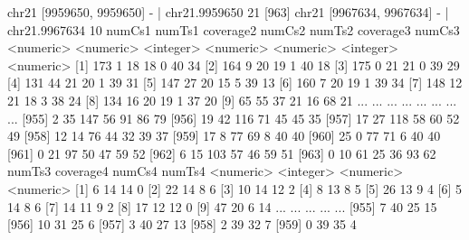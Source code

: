 \documentclass{article}
\begin{document}
\begin{Schunk}
\begin{Soutput}
  [962]    chr21   [9959650, 9959650]      -   |  chr21.9959650        21
  [963]    chr21   [9967634, 9967634]      -   |  chr21.9967634        10
           numCs1    numTs1 coverage2    numCs2    numTs2 coverage3    numCs3
        <numeric> <numeric> <integer> <numeric> <numeric> <integer> <numeric>
    [1]       173         1        18        18         0        40        34
    [2]       164         9        20        19         1        40        18
    [3]       175         0        21        21         0        39        29
    [4]       131        44        21        20         1        39        31
    [5]       147        27        20        15         5        39        13
    [6]       160         7        20        19         1        39        34
    [7]       148        12        21        18         3        38        24
    [8]       134        16        20        19         1        37        20
    [9]        65        55        37        21        16        68        21
    ...       ...       ...       ...       ...       ...       ...       ...
  [955]         2        35       147        56        91        86        79
  [956]        19        42       116        71        45        45        35
  [957]        17        27       118        58        60        52        49
  [958]        12        14        76        44        32        39        37
  [959]        17         8        77        69         8        40        40
  [960]        25         0        77        71         6        40        40
  [961]         0        21        97        50        47        59        52
  [962]         6        15       103        57        46        59        51
  [963]         0        10        61        25        36        93        62
           numTs3 coverage4    numCs4    numTs4
        <numeric> <integer> <numeric> <numeric>
    [1]         6        14        14         0
    [2]        22        14         8         6
    [3]        10        14        12         2
    [4]         8        13         8         5
    [5]        26        13         9         4
    [6]         5        14         8         6
    [7]        14        11         9         2
    [8]        17        12        12         0
    [9]        47        20         6        14
    ...       ...       ...       ...       ...
  [955]         7        40        25        15
  [956]        10        31        25         6
  [957]         3        40        27        13
  [958]         2        39        32         7
  [959]         0        39        35         4

\end{Soutput}
\end{Schunk}
\end{document}
